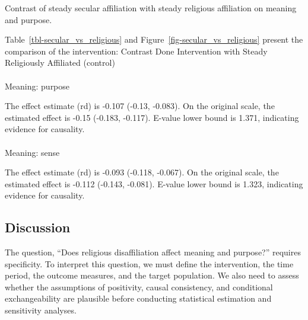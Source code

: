 \documentclass[
  single column]{article}
\makeatletter
\let\oldparagraph\paragraph
\renewcommand{\paragraph}{
    \@ifstar
      \xxxParagraphStar
      \xxxParagraphNoStar
  }
\newcommand{\xxxParagraphStar}[1]{\oldparagraph*{#1}\mbox{}}
\newcommand{\xxxParagraphNoStar}[1]{\oldparagraph{#1}\mbox{}}
\makeatother
\begin{document}
\begin{table}

\caption{\label{tbl-secular_vs_religious}Contrast of steady secular
affiliation with steady religious affiliation on meaning and purpose.}


\end{table}%

Table~\ref{tbl-secular_vs_religious} and
Figure~\ref{fig-secular_vs_religious} present the comparison of the
intervention: Contrast Done Intervention with Steady Religiously
Affiliated (control)

\paragraph{Meaning: purpose}\label{meaning-purpose-2}

The effect estimate (rd) is -0.107 (-0.13, -0.083). On the original
scale, the estimated effect is -0.15 (-0.183, -0.117). E-value lower
bound is 1.371, indicating evidence for causality.

\paragraph{Meaning: sense}\label{meaning-sense-2}

The effect estimate (rd) is -0.093 (-0.118, -0.067). On the original
scale, the estimated effect is -0.112 (-0.143, -0.081). E-value lower
bound is 1.323, indicating evidence for causality.

\newpage{}

\subsection{Discussion}\label{discussion}

The question, ``Does religious disaffiliation affect meaning and
purpose?'' requires specificity. To interpret this question, we must
define the intervention, the time period, the outcome measures, and the
target population. We also need to assess whether the assumptions of
positivity, causal consistency, and conditional exchangeability are
plausible before conducting statistical estimation and sensitivity
analyses.
\end{document}
